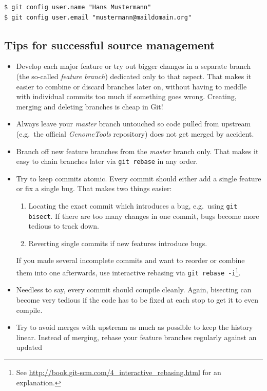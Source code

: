\documentclass[11pt,final]{article}
\newcommand{\keyword}[1]{\lstinline{#1}}
\newcommand{\Gt}[0]{\emph{GenomeTools}\xspace}
\begin{document}
\begin{lstlisting}
$ git config user.name "Hans Mustermann"
$ git config user.email "mustermann@maildomain.org"
\end{lstlisting}

\subsection{Tips for successful source management}

\begin{itemize}
\item
Develop each major feature or try out bigger changes in a separate branch
(the so-called \emph{feature branch})
dedicated only to that aspect. That makes it easier to combine or discard
branches later on, without having to meddle with individual commits too much
if something goes wrong. Creating, merging and deleting branches is cheap in
Git!
\item
Always leave your \emph{master} branch untouched so code pulled from upstream
(e.g.\ the official \Gt repository) does not get merged by accident.
\item
Branch off new feature branches from the \emph{master} branch only. That makes
it easy to chain branches later via \keyword{git rebase} in any order.
\item
Try to keep commits atomic. Every commit should either add a single feature or
fix a single bug. That makes two things easier:
\begin{enumerate}
  \item
  Locating the exact commit which introduces a bug, e.g.\ using
  \keyword{git bisect}. If there are too many changes in one commit, bugs
  become more tedious to track down.
  \item
  Reverting single commits if new features introduce bugs.
\end{enumerate}
If you made several incomplete commits and want to reorder or combine them into
one afterwards, use interactive rebasing via \keyword{git rebase
-i}\footnote{See \url{http://book.git-scm.com/4_interactive_rebasing.html} for
an explanation.}.
\item
Needless to say, every commit should compile cleanly. Again, bisecting can become
very tedious if the code has to be fixed at each stop to get it to even compile.
\item
Try to avoid merges with upstream as much as possible to keep the history linear.
Instead of merging, rebase your feature branches regularly against an updated

\end{itemize}
\end{document}

